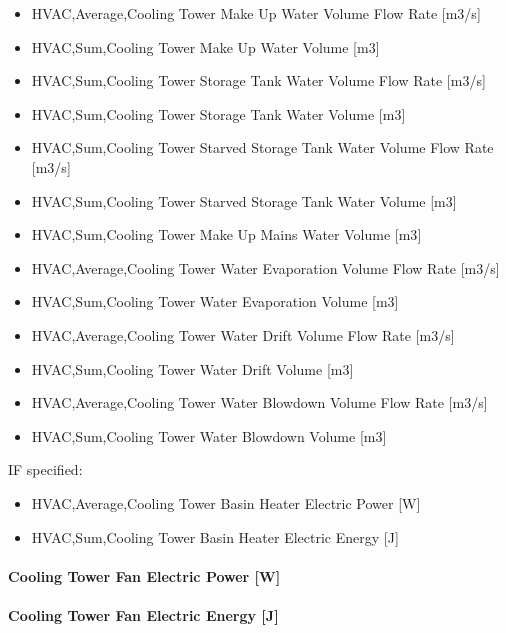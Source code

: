 \begin{itemize}
\item
  HVAC,Average,Cooling Tower Make Up Water Volume Flow Rate {[}m3/s{]}
\item
  HVAC,Sum,Cooling Tower Make Up Water Volume {[}m3{]}
\item
  HVAC,Sum,Cooling Tower Storage Tank Water Volume Flow Rate {[}m3/s{]}
\item
  HVAC,Sum,Cooling Tower Storage Tank Water Volume {[}m3{]}
\item
  HVAC,Sum,Cooling Tower Starved Storage Tank Water Volume Flow Rate {[}m3/s{]}
\item
  HVAC,Sum,Cooling Tower Starved Storage Tank Water Volume {[}m3{]}
\item
  HVAC,Sum,Cooling Tower Make Up Mains Water Volume {[}m3{]}
\item
  HVAC,Average,Cooling Tower Water Evaporation Volume Flow Rate {[}m3/s{]}
\item
  HVAC,Sum,Cooling Tower Water Evaporation Volume {[}m3{]}
\item
  HVAC,Average,Cooling Tower Water Drift Volume Flow Rate {[}m3/s{]}
\item
  HVAC,Sum,Cooling Tower Water Drift Volume {[}m3{]}
\item
  HVAC,Average,Cooling Tower Water Blowdown Volume Flow Rate {[}m3/s{]}
\item
  HVAC,Sum,Cooling Tower Water Blowdown Volume {[}m3{]}
\end{itemize}

IF specified:

\begin{itemize}
\item
  HVAC,Average,Cooling Tower Basin Heater Electric Power {[}W{]}
\item
  HVAC,Sum,Cooling Tower Basin Heater Electric Energy {[}J{]}
\end{itemize}

\paragraph{Cooling Tower Fan Electric Power {[}W{]}}\label{cooling-tower-fan-electric-power-w-1}

\paragraph{Cooling Tower Fan Electric Energy {[}J{]}}\label{cooling-tower-fan-electric-energy-j-1}


